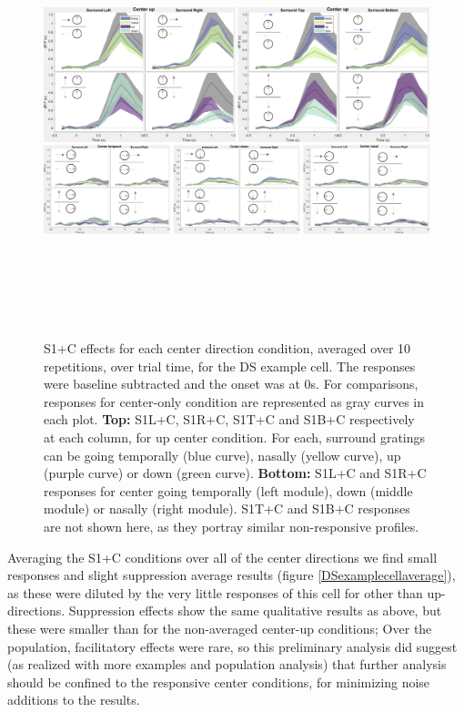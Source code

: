 \begin{figure}[H] \centering \includegraphics[width=14cm,height=12.5cm,keepaspectratio]{Figures/7.Results/individualSM/roi_29_mf379_pos5/surroundresponses.png} 
\caption{S1+C effects for each center direction condition, averaged over 10 repetitions, over trial time, for the DS example cell. The responses were baseline subtracted and the onset was at 0s. For comparisons, responses for center-only condition are represented as gray curves in each plot.
\newline \textbf{Top:} S1L+C, S1R+C, S1T+C and S1B+C respectively at each column, for up center condition. For each, surround gratings can be going temporally (blue curve), nasally (yellow curve), up (purple curve) or down (green curve).
\newline \textbf{Bottom:} S1L+C and S1R+C responses for center going temporally (left module), down (middle module) or nasally (right module). S1T+C and S1B+C responses are not shown here, as they portray similar non-responsive profiles.}
\label{DSexamplecellSM}
\end{figure}

Averaging the S1+C conditions over all of the center directions we find small responses and slight suppression average results (figure \ref{DSexamplecellaverage}), as these were diluted by the very little responses of this cell for other than up-directions. Suppression effects show the same qualitative results as above, but these were smaller than for the non-averaged center-up conditions; Over the population, facilitatory effects were rare, so this preliminary analysis did suggest (as realized with more examples and population analysis) that further analysis should be confined to the responsive center conditions, for minimizing noise additions to the results.

